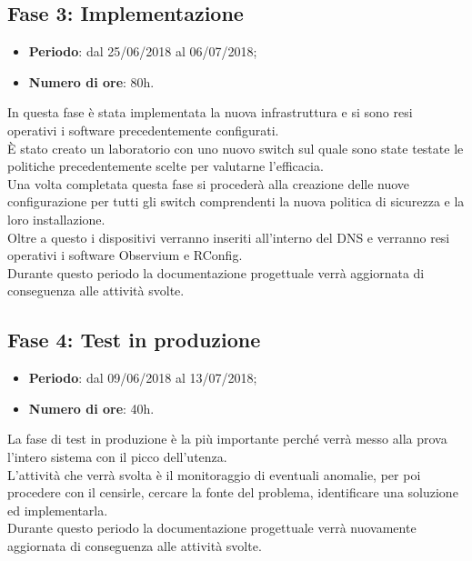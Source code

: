 \documentclass[Tesi.tex]{subfiles}
\begin{document}
\subsection{Fase 3: Implementazione}
\begin{itemize}
	\item \textbf{Periodo}: dal 25/06/2018 al 06/07/2018;
	\item \textbf{Numero di ore}: 80h.
\end{itemize}
	
In questa fase è stata implementata la nuova infrastruttura e si sono resi operativi i software precedentemente configurati. \\
\`{E} stato creato un laboratorio con uno nuovo switch sul quale sono state testate le politiche precedentemente scelte per valutarne l'efficacia.\\
Una volta completata questa fase si procederà alla creazione delle nuove configurazione per tutti gli switch comprendenti la nuova politica di sicurezza e la loro installazione. \\
Oltre a questo i dispositivi verranno inseriti all'interno del DNS e verranno resi operativi i software Observium e RConfig. \\
Durante questo periodo la documentazione progettuale verrà aggiornata di conseguenza alle attività svolte.\\


\subsection{Fase 4: Test in produzione}
\begin{itemize}
	\item \textbf{Periodo}: dal 09/06/2018 al 13/07/2018;
	\item \textbf{Numero di ore}: 40h.
\end{itemize}
	
La fase di test in produzione è la più importante perché verrà messo alla prova l'intero sistema con il picco dell'utenza. \\
L'attività che verrà svolta è il monitoraggio di eventuali anomalie, per poi procedere con il censirle, cercare la fonte del problema, identificare una soluzione ed implementarla. \\
Durante questo periodo la documentazione progettuale verrà nuovamente aggiornata di conseguenza alle attività svolte.\\

	
\end{document}
